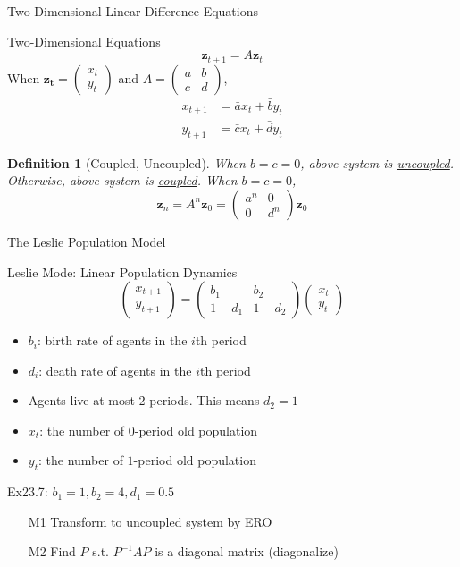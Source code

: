 \documentclass[final]{beamer}
\newtheorem{defn}{Definition}
\newcommand{\bd}{\mathbf}
\begin{document}
\begin{frame}[t]{Two Dimensional Linear Difference Equations}
	\begin{block}
		{Two-Dimensional Equations}
		\[
			\bd{z}_{t+1} = A\bd{z}_{t}
		\]When $\bd{z_t}=\begin{pmatrix}
			x_t\\y_t
		\end{pmatrix}$ and $A=\begin{pmatrix}
			a&b\\c&d
		\end{pmatrix}$,
		\begin{align*}
			x_{t+1} &= \bar{a}x_t + \bar{b}y_t\\
			y_{t+1} &= \bar{c}x_t + \bar{d}y_t
		\end{align*}
	\end{block}
	\begin{defn}
		[Coupled, Uncoupled] When $b=c=0$, above system is \uline{uncoupled}. Otherwise, above system is \uline{coupled}. When $b=c=0$, \[
			\bd{z}_n = A^n \bd{z}_0 = \begin{pmatrix}
				a^n & 0 \\ 
				0 & d^n
			\end{pmatrix} \bd{z}_0 
		\]
	\end{defn}
\end{frame}

\begin{frame}[t]{The Leslie Population Model}
	\begin{block}
		{Leslie Mode: Linear Population Dynamics} 
		\[
			\begin{pmatrix}
				x_{t+1}\\
				y_{t+1}
			\end{pmatrix} = \begin{pmatrix}
				b_1 & b_2\\
				1-d_1 & 1-d_2
			\end{pmatrix}\begin{pmatrix}
				x_t\\
				y_t
			\end{pmatrix}
		\]
		\begin{itemize}
			\item $b_i$: birth rate of agents in the $i$th period
			\item $d_i$: death rate of agents in the $i$th period
			\item Agents live at most 2-periods. This means $d_2=1$
			\item $x_t$: the number of $0$-period old population
			\item $y_t$: the number of $1$-period old population
		\end{itemize}
	\end{block}
	Ex23.7: $b_1=1, b_2=4, d_1=0.5$
	\begin{itemize}
		\item [M1] Transform to uncoupled system by ERO
		\item [M2] Find $P$ s.t. $P^{-1}AP$ is a diagonal matrix (diagonalize)
	\end{itemize}
\end{frame}
\end{document}
